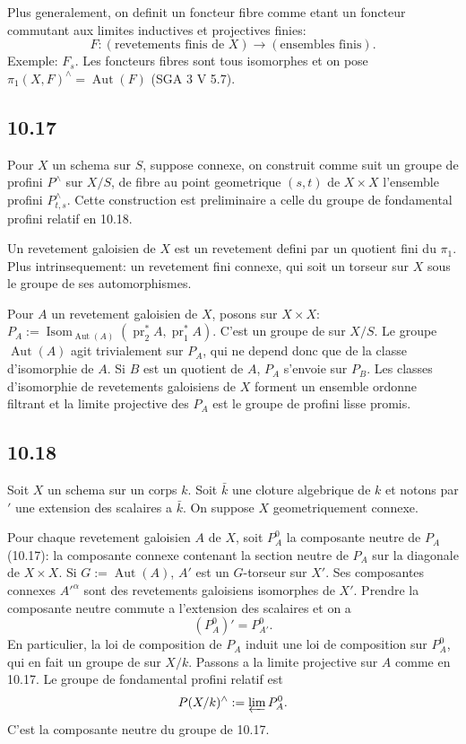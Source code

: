 \documentclass[12pt,a4paper]{article}
\theoremstyle{plain}
\theoremstyle{definition}
\theoremstyle{remark}
\DeclareMathOperator{\Isom}{Isom}
\DeclareMathOperator{\Aut}{Aut}
\DeclareMathOperator{\pr}{pr}
\begin{document}
Plus generalement, on definit un foncteur fibre comme etant un foncteur commutant aux limites inductives et projectives finies:
$$F: (\text{revetements finis de } X) \longrightarrow (\text{ensembles finis}).$$
Exemple: $F_s$. Les foncteurs fibres sont tous isomorphes et on pose $\pi_1(X, F)^\wedge = \Aut(F)$ (SGA 3 V 5.7).

\subsection*{10.17}

Pour $X$ un schema sur $S$, suppose connexe, on construit comme suit un groupe de profini $P^\wedge$ sur $X/S$, de fibre au point geometrique $(s, t)$ de $X \times X$ l'ensemble profini $P^\wedge_{t,s}$. Cette construction est preliminaire a celle du groupe de fondamental profini relatif en 10.18.

Un revetement galoisien de $X$ est un revetement defini par un quotient fini du $\pi_1$. Plus intrinsequement: un revetement fini connexe, qui soit un torseur sur $X$ sous le groupe de ses automorphismes.

Pour $A$ un revetement galoisien de $X$, posons sur $X \times X$: $P_A := \Isom_{\Aut(A)}(\pr_2^* A, \pr_1^* A)$. C'est un groupe de sur $X/S$. Le groupe $\Aut(A)$ agit trivialement sur $P_A$, qui ne depend donc que de la classe d'isomorphie de $A$. Si $B$ est un quotient de $A$, $P_A$ s'envoie sur $P_B$. Les classes d'isomorphie de revetements galoisiens de $X$ forment un ensemble ordonne filtrant et la limite projective des $P_A$ est le groupe de profini lisse promis.

\subsection*{10.18}

Soit $X$ un schema sur un corps $k$. Soit $\bar{k}$ une cloture algebrique de $k$ et notons par $'$ une extension des scalaires a $\bar{k}$. On suppose $X$ geometriquement connexe.

Pour chaque revetement galoisien $A$ de $X$, soit $P_A^0$ la composante neutre de $P_A$ (10.17): la composante connexe contenant la section neutre de $P_A$ sur la diagonale de $X \times X$. Si $G := \Aut(A)$, $A'$ est un $G$-torseur sur $X'$. Ses composantes connexes $A'^\alpha$ sont des revetements galoisiens isomorphes de $X'$. Prendre la composante neutre commute a l'extension des scalaires et on a
$$(P_A^0)' = P_{A'}^0.$$
En particulier, la loi de composition de $P_A$ induit une loi de composition sur $P_A^0$, qui en fait un groupe de sur $X/k$. Passons a la limite projective sur $A$ comme en 10.17. Le groupe de fondamental profini relatif est
$$P(X/k)^\wedge := \varprojlim P_A^0.$$
C'est la composante neutre du groupe de 10.17.
\end{document}
